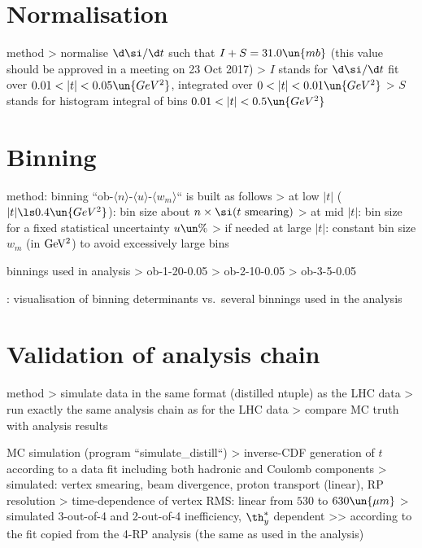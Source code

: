 \chapter[normalisation]{Normalisation}

\> method
\>> normalise $\d\si/\d t$ such that $I + S = 31.0\un{mb}$ (this value should be approved in a meeting on 23 Oct 2017)
\>> $I$ stands for $\d\si/\d t$ fit over $0.01 < |t| < 0.05\un{GeV^2}$, integrated over $0 < |t| < 0.01\un{GeV^2}$
\>> $S$ stands for histogram integral of bins $0.01 < |t| < 0.5\un{GeV^2}$



\chapter[binning]{Binning}

\> method: binning ``ob-$\langle n\rangle$-$\langle u\rangle$-$\langle w_m\rangle$`` is built as follows
\>> at low $|t|$ ($|t| \ls 0.4\un{GeV^2}$): bin size about $n\times \si(\hbox{$t$ smearing})$
\>> at mid $|t|$: bin size for a fixed statistical uncertainty $u\un{\%}$
\>> if needed at large $|t|$: constant bin size $w_m$ (in $\rm GeV^2$) to avoid excessively large bins

\> binnings used in analysis
\>> ob-1-20-0.05
\>> ob-2-10-0.05
\>> ob-3-5-0.05

\>  : visualisation of binning determinants vs.~several binnings used in
the analysis



\chapter[validation]{Validation of analysis chain}

\> method
\>> simulate data in the same format (distilled ntuple) as the LHC data
\>> run exactly the same analysis chain as for the LHC data
\>> compare MC truth with analysis results

\> MC simulation (program ``simulate\_distill``)
\>> inverse-CDF generation of $t$ according to a data fit including both hadronic and Coulomb components
\>> simulated: vertex smearing, beam divergence, proton transport (linear), RP resolution
\>> time-dependence of vertex RMS: linear from $530$ to $630\un{\mu m}$
\>> simulated 3-out-of-4 and 2-out-of-4 inefficiency, $\th^*_y$ dependent
\>>> according to the fit copied from the 4-RP analysis (the same as used in the analysis)

